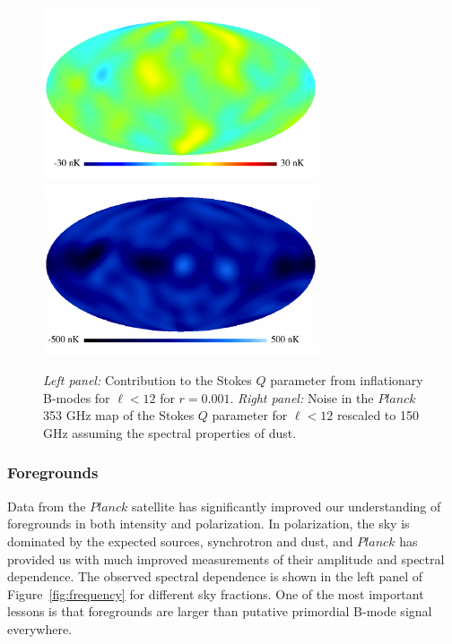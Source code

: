 \begin{figure}[h]
\begin{center}
\includegraphics[width=3.2in]{Figures/P15_2_12_rp001.pdf}
\includegraphics[width=3.2in]{Figures/P353_N_2_12.pdf}
\end{center}
\caption{{\it Left panel:} Contribution to the Stokes $Q$ parameter from inflationary B-modes for $\ell<12$ for $r=0.001$. {\it Right panel:} Noise in the $Planck$ 353 GHz map of the Stokes $Q$ parameter for $\ell<12$ rescaled to 150 GHz assuming the spectral properties of dust.}
\label{fig:Qrp001}
\end{figure}
\subsubsection{Foregrounds}
Data from the $Planck$ satellite has significantly improved our understanding of foregrounds in both intensity and polarization. 
In polarization, the sky is dominated by the expected sources, synchrotron and dust, and $Planck$ has provided us with much improved measurements of their amplitude and spectral dependence. The observed spectral dependence is shown in the left panel of Figure~\ref{fig:frequency} for different sky fractions. One of the most important lessons is that foregrounds are larger than putative primordial B-mode signal everywhere. 

